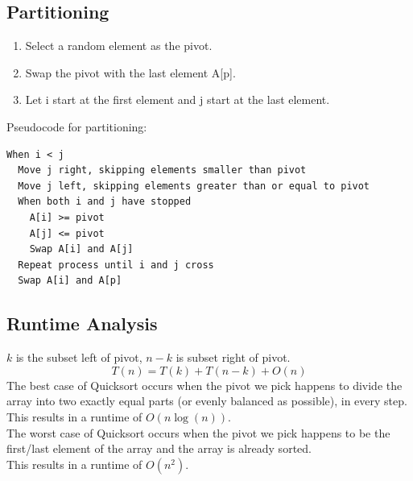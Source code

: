 \documentclass{report}
\begin{document}
\subsection{Partitioning}
\begin{enumerate}
\item Select a random element as the pivot.
\item Swap the pivot with the last element A[p].
\item Let i start at the first element and j start at the last element.
\end{enumerate}
Pseudocode for partitioning:
\begin{verbatim}
When i < j
  Move j right, skipping elements smaller than pivot
  Move j left, skipping elements greater than or equal to pivot
  When both i and j have stopped
    A[i] >= pivot
    A[j] <= pivot
    Swap A[i] and A[j]
  Repeat process until i and j cross
  Swap A[i] and A[p]
\end{verbatim}

\subsection{Runtime Analysis}
$k$ is the subset left of pivot, $n-k$ is subset right of pivot.
\[ T(n) = T(k) + T(n-k) + O(n) \]
The best case of Quicksort occurs when the pivot we pick happens to divide the array into two exactly equal parts (or evenly balanced as possible), in every step.\\
This results in a runtime of $O(n\log(n))$.\\
The worst case of Quicksort occurs when the pivot we pick happens to be the first/last element of the array and the array is already sorted.\\
This results in a runtime of $O(n^2)$.\\
\end{document}
